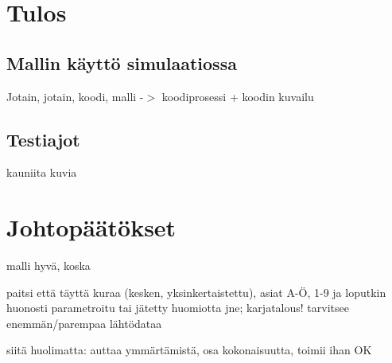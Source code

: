 \documentclass[12pt]{scrreprt}
\begin{document}
  \chapter{Tulos}

  \section{Mallin käyttö simulaatiossa}

  Jotain, jotain, koodi, malli -$>$ koodiprosessi + koodin kuvailu

  \section{Testiajot}

  kauniita kuvia

  \chapter{Johtopäätökset}

  malli hyvä, koska
  
  paitsi että täyttä kuraa (kesken, yksinkertaistettu), asiat A-Ö, 1-9 ja
  loputkin huonosti parametroitu tai jätetty huomiotta jne; karjatalous!
  tarvitsee enemmän/parempaa lähtödataa
  
  siitä huolimatta: auttaa ymmärtämistä, osa kokonaisuutta, toimii ihan OK
\end{document}
